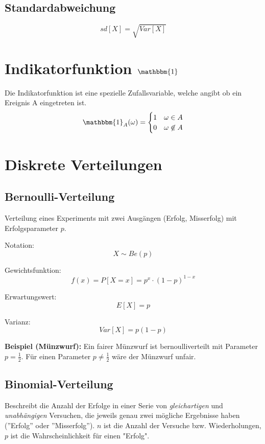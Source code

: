 \documentclass[10pt,a4paper,twocolumn]{article}
\begin{document}
\subsection{Standardabweichung}
\[
sd[X] = \sqrt{Var[X]}
\]

\section{Indikatorfunktion $\mathbbm{1}$}
Die Indikatorfunktion ist eine spezielle Zufallsvariable, welche angibt ob ein Ereignis A eingetreten ist.
\begin{equation}
	\mathbbm{1}_A(\omega) = \begin{cases}
			1 & \omega \in A\\
			0 & \omega \not\in A
		\end{cases}
\end{equation}


\section{Diskrete Verteilungen}

\subsection{Bernoulli-Verteilung}
Verteilung eines Experiments mit zwei Ausgängen (Erfolg, Misserfolg) mit Erfolgsparameter $p$.

\vspace{10pt}

Notation:
\[
X \sim Be(p)
\]

Gewichtsfunktion:
\[
f(x)=P[X=x]=p^x\cdot (1-p)^{1-x}
\]

Erwartungswert:
\[
E[X]=p
\]

Varianz:
\[
Var[X]=p(1-p)
\]

\textbf{Beispiel (Münzwurf):} Ein fairer Münzwurf ist bernoulliverteilt mit Parameter $p=\frac{1}{2}$. Für einen Parameter $p\neq\frac{1}{2}$ wäre der Münzwurf unfair.

\subsection{Binomial-Verteilung}
Beschreibt die Anzahl der Erfolge in einer Serie von \emph{gleichartigen} und \emph{unabhängigen} Versuchen, die jeweils genau zwei mögliche Ergebnisse haben (''Erfolg'' oder ''Misserfolg''). $n$ ist die Anzahl der Versuche bzw. Wiederholungen, $p$ ist die Wahrscheinlichkeit für einen "Erfolg".
\end{document}
